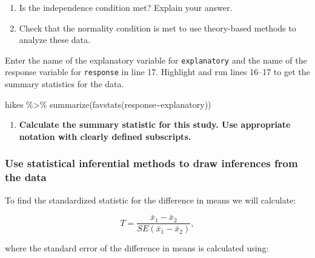 \documentclass[
]{report}
\newenvironment{Shaded}{\begin{snugshade}}{\end{snugshade}}
\newcommand{\FunctionTok}[1]{\textcolor[rgb]{0.00,0.00,0.00}{#1}}
\newcommand{\NormalTok}[1]{#1}
\newcommand{\SpecialCharTok}[1]{\textcolor[rgb]{0.00,0.00,0.00}{#1}}
\providecommand{\tightlist}{%
  \setlength{\itemsep}{0pt}\setlength{\parskip}{0pt}}
\begin{document}
\begin{enumerate}
\def\labelenumi{\arabic{enumi}.}
\setcounter{enumi}{3}
\item
  Is the independence condition met? Explain your answer.
  \vspace{0.4in}
\item
  Check that the normality condition is met to use theory-based methods to analyze these data.
\end{enumerate}

\vspace{0.8in}

Enter the name of the explanatory variable for \texttt{explanatory} and the name of the response variable for \texttt{response} in line 17. Highlight and run lines 16--17 to get the summary statistics for the data.

\begin{Shaded}
\begin{Highlighting}[]
\NormalTok{hikes }\SpecialCharTok{\%\textgreater{}\%}
  \FunctionTok{summarize}\NormalTok{(}\FunctionTok{favstats}\NormalTok{(response}\SpecialCharTok{\textasciitilde{}}\NormalTok{explanatory))}
\end{Highlighting}
\end{Shaded}

\begin{enumerate}
\def\labelenumi{\arabic{enumi}.}
\setcounter{enumi}{5}
\tightlist
\item
  \textbf{Calculate the summary statistic for this study. Use appropriate notation with clearly defined subscripts.}
\end{enumerate}

\vspace{1in}

\hypertarget{use-statistical-inferential-methods-to-draw-inferences-from-the-data-4}{%
\subsubsection*{Use statistical inferential methods to draw inferences from the data}\label{use-statistical-inferential-methods-to-draw-inferences-from-the-data-4}}

To find the standardized statistic for the difference in means we will calculate:

\[T = \frac{\bar{x}_1-\bar{x}_2}{SE(\bar{x}_1-\bar{x}_2)},\]

where the standard error of the difference in means is calculated using:
\end{document}
